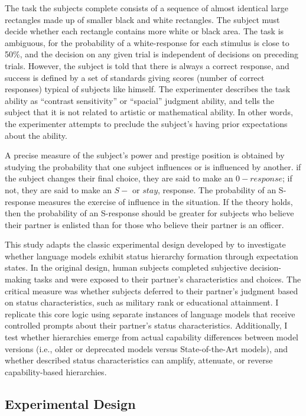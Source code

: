 The task the subjects complete consists of a sequence of almost identical large rectangles made up of smaller black and white rectangles. The subject must decide whether each rectangle contains more white or black area. The task is ambiguous, for the probability of a white-response for each stimulus is close to 50\%, and the decision on any given trial is independent of decisions on preceding trials. However, the subject is told that there is always a correct response, and success is defined by a set of standards giving scores (number of correct responses) typical of subjects like himself. The experimenter describes the task ability as ``contrast sensitivity'' or ``spacial'' judgment ability, and tells the subject that it is not related to artistic or mathematical ability. In other words, the experimenter attempts to preclude the subject's having prior expectations about the ability.

A precise measure of the subject's power and prestige position is obtained by studying the probability that one subject influences or is influenced by another. if the subject changes their final choice, they are said to make an $0-response$; if not, they are said to make an $S-$ or $stay$, response. The probability of an S-response measures the exercise of influence in the situation. If the theory holds, then the probability of an S-response should be greater for subjects who believe their partner is enlisted than for those who believe their partner is an officer. 

This study adapts the classic experimental design developed by \citet{Berger-1972-Status} to investigate whether language models exhibit status hierarchy formation through expectation states. In the original design, human subjects completed subjective decision-making tasks and were exposed to their partner's characteristics and choices. The critical measure was whether subjects deferred to their partner's judgment based on status characteristics, such as military rank or educational attainment. I replicate this core logic using separate instances of language models that receive controlled prompts about their partner's status characteristics. Additionally, I test whether hierarchies emerge from actual capability differences between model versions (i.e., older or deprecated models versus State-of-the-Art models), and whether described status characteristics can amplify, attenuate, or reverse capability-based hierarchies.

\subsection{Experimental Design}

